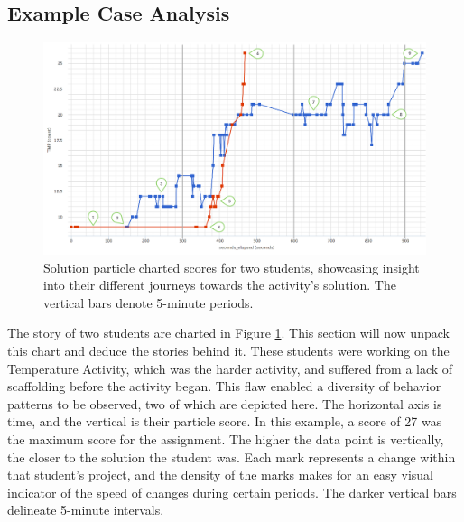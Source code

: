 \subsection{Example Case Analysis}

\begin{figure}
  \centering
      \includegraphics[width=\textwidth]{images/particles-graph-annotated}
  \caption[Solution particle charted scores for two students]{Solution particle charted scores for two students, showcasing insight into their different journeys towards the activity's solution. The vertical bars denote 5-minute periods.}
  \label{fig:paricles-temperature-two}
\end{figure}

The story of two students are charted in Figure \ref{fig:paricles-temperature-two}. This section will now unpack this chart and deduce the stories behind it. These students were working on the Temperature Activity, which was the harder activity, and suffered from a lack of scaffolding before the activity began. This flaw enabled a diversity of behavior patterns to be observed, two of which are depicted here. The horizontal axis is time, and the vertical is their particle score. In this example, a score of 27 was the maximum score for the assignment. The higher the data point is vertically, the closer to the solution the student was. Each mark represents a change within that student's project, and the density of the marks makes for an easy visual indicator of the speed of changes during certain periods. The darker vertical bars delineate 5-minute intervals.

